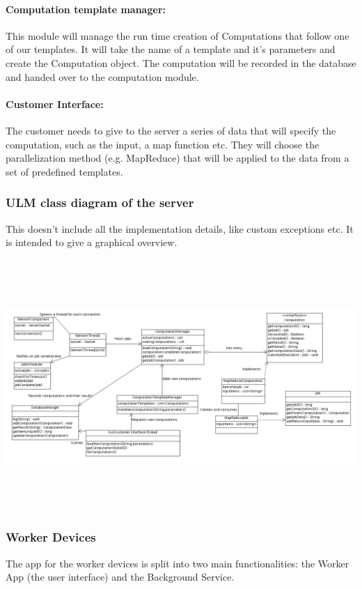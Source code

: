 \documentclass[a4paper,10pt]{article}
\begin{document}
\paragraph{Computation template manager:}

This module will manage the run time creation of Computations that follow one of our templates. It will take the name of a template and it's parameters and create the Computation object.
The computation will be recorded in the database and handed over to the computation module.

\paragraph{Customer Interface:}

The customer needs to give to the server a series of data that will specify the computation, such as the input, a map function etc.
They will choose the parallelization method (e.g. MapReduce) that will be applied to the data from a set of predefined templates.

\subsubsection{ULM class diagram of the server}
This doesn't include all the implementation details, like custom exceptions etc. It is intended to give a graphical overview.

\hspace{-95pt}\includegraphics[height=270pt]{serveruml.png}

\subsubsection{Worker Devices}
The app for the worker devices is split into two main functionalities: the Worker App (the user interface) and the Background Service. 
\end{document}
